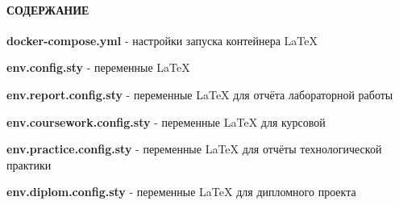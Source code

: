 \documentclass[12pt, a4paper, simple]{eskdtext}
\begin{document}
    

  \thispagestyle{plain}   %
  \pagestyle{plain}       %
  \hspace{0pt}

  \paragraph{СОДЕРЖАНИЕ} \hspace{0pt}

  \hspace{0pt}

  \textbf{docker-compose.yml} - настройки запуска контейнера LaTeX

  \textbf{env.config.sty} - переменные LaTeX

  \textbf{env.report.config.sty} - переменные LaTeX для отчёта лабораторной работы

  \textbf{env.coursework.config.sty} - переменные LaTeX для курсовой

  \textbf{env.practice.config.sty} - переменные LaTeX для отчёты технологической практики

  \textbf{env.diplom.config.sty} - переменные LaTeX для дипломного проекта

  \newpage

  

  

  

  \newpage
  

  \newpage
  

  \newpage
  
\end{document}
